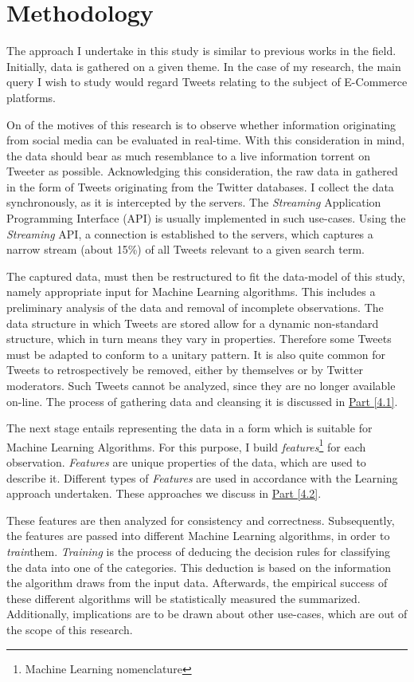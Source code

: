 \section{Methodology}
	The approach I undertake in this study is similar to previous works in the field. Initially, data is gathered on a given theme. In the case of my research, the main query I wish to study would regard Tweets relating to the subject of E-Commerce platforms.
	\par
	On of the motives of this research is to observe whether information originating from social media can be evaluated in real-time. With this consideration in mind, the data should bear as much resemblance to a live information torrent on Tweeter as possible. Acknowledging this consideration, the raw data in gathered in the form of Tweets originating from the Twitter databases. I collect the data synchronously, as it is intercepted by the servers. The \textit{Streaming} Application Programming Interface (API)\cite{stream_api} is usually implemented in such use-cases. Using the \textit{Streaming} API, a connection is established to the servers, which captures a narrow stream (about 15\%) of all Tweets relevant to a given search term. 
	\par
	The captured data, must then be restructured to fit the data-model of this study, namely appropriate input for Machine Learning algorithms. This includes a preliminary analysis of the data and removal of incomplete observations. The data structure in which Tweets are stored allow for a dynamic non-standard structure, which in turn means they vary in properties. Therefore some Tweets must be adapted to conform to a unitary pattern. It is also quite common for Tweets to retrospectively be removed, either by themselves or by Twitter moderators. Such Tweets cannot be analyzed, since they are no longer available on-line. The process of gathering data and cleansing it is discussed in \hyperref[sec:collect_data]{Part [4.1]}.
	\par
	The next stage entails representing the data in a form which is suitable for Machine Learning Algorithms. For this purpose, I build \textit{features}\footnote{\label{ml_note}Machine Learning nomenclature} for each observation. \textit{Features} are unique properties of the data, which are used to describe it. Different types of \textit{Features} are used in accordance with the Learning approach undertaken. These approaches  we discuss in \hyperref[build_features]{Part [4.2]}.
	\par
	These features are then analyzed for consistency and correctness. Subsequently, the features are passed into different Machine Learning algorithms, in order to \textit{train}\footnotemark[1] them. \textit{Training} is the process of deducing the decision rules for classifying the data into one of the categories. This deduction is based on the information the algorithm draws from the input data. Afterwards, the empirical success of these different algorithms will be statistically measured the summarized. Additionally, implications are to be drawn about other use-cases, which are out of the scope of this research. 
	
